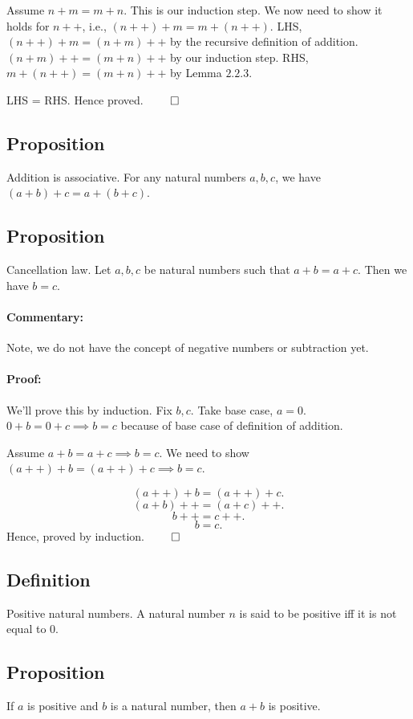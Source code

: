 \documentclass{report}
\begin{document}
Assume $n+m = m+n$. This is our induction step. We now need to show it holds for $n++$, i.e., $\left( n++ \right) + m = m + \left( n++ \right) $. 
LHS, $\left( n++ \right) + m = \left( n+m \right) ++	$ by the recursive definition of addition. $\left( n+m \right) ++ = \left( m+n \right) ++$ by our induction step.
RHS, $m+ \left( n++ \right) = \left( m+n \right)++ $ by Lemma $2.2.3$.

LHS = RHS. Hence proved. $\qed$

\subsection{Proposition} Addition is associative. For any natural numbers $a,b,c$, we have $(a+b)+c = a+\left( b+c \right) $.

\subsection{Proposition} Cancellation law. Let  $a,b,c$ be natural numbers such that $a+b = a + c$. Then we have $b=c$.
 \paragraph{Commentary: }Note, we do not have the concept of negative numbers or subtraction yet.
\paragraph{Proof: }We'll prove this by induction. Fix $b,c$. Take base case,  $a = 0 $. $0+b = 0 + c \implies b = c$ because of base case of definition of addition.

Assume $a+b = a+c \implies b = c$. We need to show $\left( a++ \right) +b =  \left( a ++ \right) + c \implies b = c $.

\[
\left( a++ \right) + b = \left( a++ \right) +c 
.\] 
 \[
	 \left( a+b \right) ++ = \left( a+c \right) ++ \tag{by defintion of addition}
.\]
\[
	b++ = c++ \tag{by assumption of the induction step}
.\] 
\[
b = c
.\] 
Hence, proved by induction.  $\qed$

\subsection{Definition} Positive natural numbers. A natural number $n$ is said to be positive iff it is not equal to $0$. 

\subsection{Proposition} If $a$ is positive and $b$ is a natural number, then $a+b$ is positive.
\end{document}
